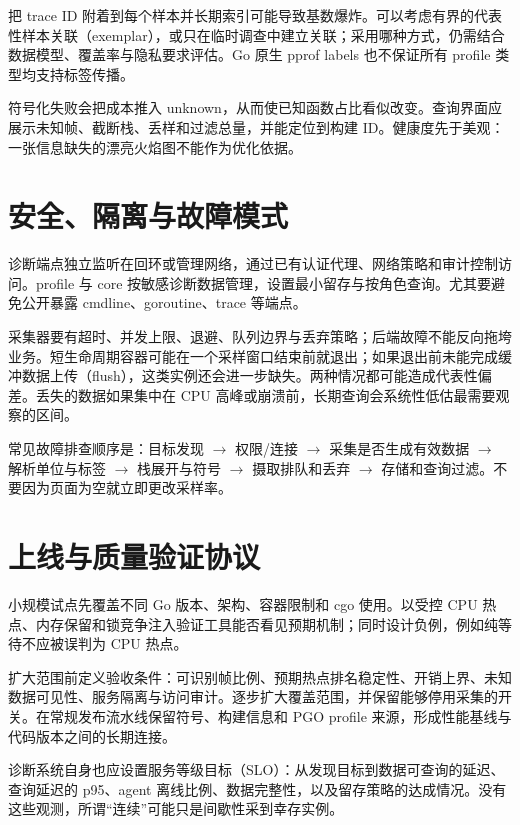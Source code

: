 \documentclass[UTF8,fontset=fandol,openany,11pt]{ctexbook}
\begin{document}
把 trace ID 附着到每个样本并长期索引可能导致基数爆炸。可以考虑有界的代表性样本关联（exemplar），或只在临时调查中建立关联；采用哪种方式，仍需结合数据模型、覆盖率与隐私要求评估。Go 原生 pprof labels 也不保证所有 profile 类型均支持标签传播。

符号化失败会把成本推入 unknown，从而使已知函数占比看似改变。查询界面应展示未知帧、截断栈、丢样和过滤总量，并能定位到构建 ID。健康度先于美观：一张信息缺失的漂亮火焰图不能作为优化依据。

\section{安全、隔离与故障模式}
诊断端点独立监听在回环或管理网络，通过已有认证代理、网络策略和审计控制访问。profile 与 core 按敏感诊断数据管理，设置最小留存与按角色查询。尤其要避免公开暴露 cmdline、goroutine、trace 等端点。

采集器要有超时、并发上限、退避、队列边界与丢弃策略；后端故障不能反向拖垮业务。短生命周期容器可能在一个采样窗口结束前就退出；如果退出前未能完成缓冲数据上传（flush），这类实例还会进一步缺失。两种情况都可能造成代表性偏差。丢失的数据如果集中在 CPU 高峰或崩溃前，长期查询会系统性低估最需要观察的区间。

常见故障排查顺序是：目标发现 \ensuremath{\rightarrow}\allowbreak{} 权限/连接 \ensuremath{\rightarrow}\allowbreak{} 采集是否生成有效数据 \ensuremath{\rightarrow}\allowbreak{} 解析单位与标签 \ensuremath{\rightarrow}\allowbreak{} 栈展开与符号 \ensuremath{\rightarrow}\allowbreak{} 摄取排队和丢弃 \ensuremath{\rightarrow}\allowbreak{} 存储和查询过滤。不要因为页面为空就立即更改采样率。

\section{上线与质量验证协议}
小规模试点先覆盖不同 Go 版本、架构、容器限制和 cgo 使用。以受控 CPU 热点、内存保留和锁竞争注入验证工具能否看见预期机制；同时设计负例，例如纯等待不应被误判为 CPU 热点。

扩大范围前定义验收条件：可识别帧比例、预期热点排名稳定性、开销上界、未知数据可见性、服务隔离与访问审计。逐步扩大覆盖范围，并保留能够停用采集的开关。在常规发布流水线保留符号、构建信息和 PGO profile 来源，形成性能基线与代码版本之间的长期连接。

诊断系统自身也应设置服务等级目标（SLO）：从发现目标到数据可查询的延迟、查询延迟的 p95、agent 离线比例、数据完整性，以及留存策略的达成情况。没有这些观测，所谓“连续”可能只是间歇性采到幸存实例。
\end{document}
